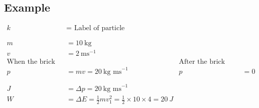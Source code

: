 \documentclass[12pt]{article}
\begin{document}
\subsection{Example}
\begin{align*}
	k                               & = \text{ Label of particle}                                                                                          \\
	\phantom{=}                                                                                                                                            \\
	m                               & = 10 ~\text{kg}                                                                                                      \\
	v                               & = 2 ~\text{ms}^{-1}                                                                                                  \\
	\text{When the brick is thrown} &                                                                          & \text{After the brick hits Alberto}       \\
	p                               & = mv = 20 ~\text{kg ms}^{-1}                                             & p                                   & = 0 \\
	\phantom{=}                                                                                                                                            \\
	J                               & = \Delta p = 20 ~\text{kg ms}^{-1}                                                                                   \\
	W                               & = \Delta E = \frac{1}{2}mv_1^2 = \frac{1}{2} \times 10 \times 4 = 20 ~ J                                             \\
\end{align*}
\end{document}
